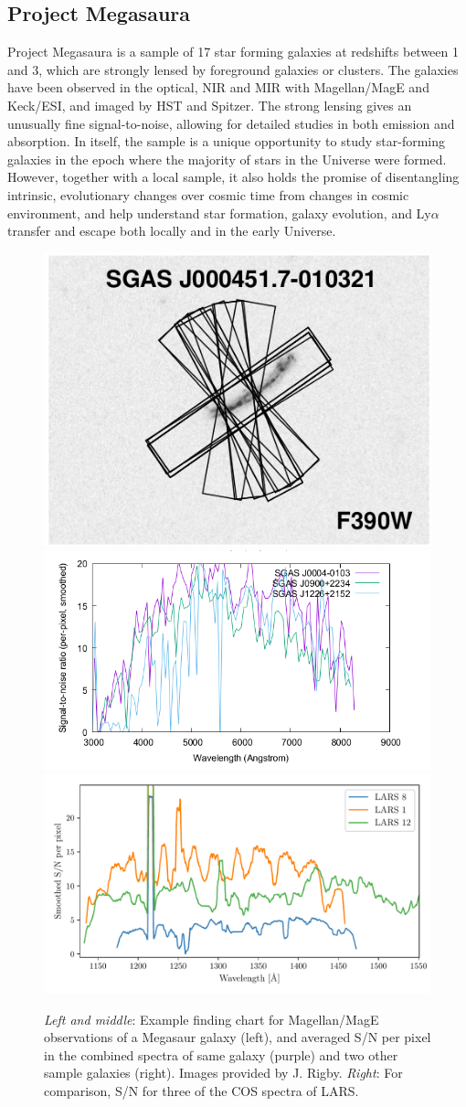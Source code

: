 \documentclass[12pt]{amsart}
\begin{document}
\subsection{Project Megasaura}

Project Megasaura is a sample of 17 star forming galaxies at redshifts between 1
and 3, which are strongly lensed by  foreground galaxies or clusters. The
galaxies have been observed in the optical, NIR and MIR with Magellan/MagE and
Keck/ESI, and imaged by HST and Spitzer. The strong lensing gives an unusually 
fine signal-to-noise, allowing for detailed studies in both emission and
absorption.  In itself, the sample is a unique opportunity to study
star-forming galaxies in the epoch where the majority of stars in the Universe
were formed. However, together with a local sample, it also holds the promise of
disentangling intrinsic, evolutionary changes over cosmic time from changes in
cosmic environment, and help understand star formation, galaxy evolution, and
Ly$\alpha$ transfer and escape both locally and in the early Universe.

\begin{figure}[htbp] %
   \centering
   \includegraphics[width=.25\textwidth]{MegasaurExample.png}
   \includegraphics[width=.38\textwidth]{SNRs.png} 
   \includegraphics[width=.35\textwidth]{Figures/LARS_SNRs_examples.pdf} 
   \caption{\emph{Left and middle}: Example finding chart for Magellan/MagE
	   observations of a Megasaur galaxy (left), and averaged S/N per pixel
	   in the combined spectra of same galaxy (purple) and two other sample
	   galaxies (right). Images provided by J. Rigby. \emph{Right}: For
	   comparison, S/N for three of the COS spectra of LARS.}
   \label{fig:mega}
\end{figure}
\end{document}
